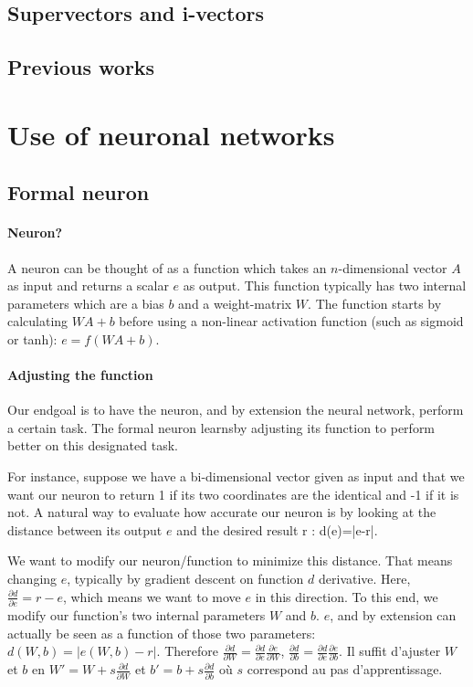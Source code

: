 \documentclass[conference]{IEEEtran}
\begin{document}
\subsection{Supervectors and i-vectors}

\subsection{Previous works}

\section{Use of neuronal networks}

\subsection{Formal neuron}

\paragraph{Neuron?}
A neuron can be thought of as a function which takes an $n$-dimensional vector $A$ as input and returns a scalar $e$ as output. This function typically has two internal parameters which are a bias $b$ and a weight-matrix $W$. The function starts by calculating $WA+b$ before using a non-linear activation function (such as sigmoid or tanh): $e=f(WA+b)$.

\paragraph{Adjusting the function}
Our endgoal is to have the neuron, and by extension the neural network, perform
a certain task. The formal neuron \og learns\fg by adjusting its function to perform better on
this designated task.

For instance, suppose we have a bi-dimensional vector given as input and that we
want our neuron to return 1 if its two coordinates are the identical and -1 if
it is not. A natural way to evaluate how accurate our neuron is by looking at the
distance between its output $e$ and the desired result r : d(e)=|e-r|.

We want to modify our neuron/function to minimize this distance. That means
changing $e$, typically by gradient descent on function $d$ derivative. Here,
$\frac{\partial d}{\partial e} = r-e$, which means we want to \og move\fg{} $e$ in this
direction. To this end, we modify our function's two internal parameters $W$ and
$b$. $e$, and by extension can actually be seen as a function of those two
parameters: $d(W,b)=|e(W,b)-r|$. Therefore $\frac{\partial d}{\partial W}
   = \frac{\partial d}{\partial e}\frac{\partial e}{\partial W}$,
$\frac{\partial d}{\partial b}
   = \frac{\partial d}{\partial e}\frac{\partial e}{\partial b}$. Il suffit
   d'ajuster $W$ et $b$ en $W'=W + s\frac{\partial d}{\partial W}$ et $b'=b +
   s\frac{\partial d}{\partial b}$ où $s$ correspond au pas d'apprentissage.
\end{document}
